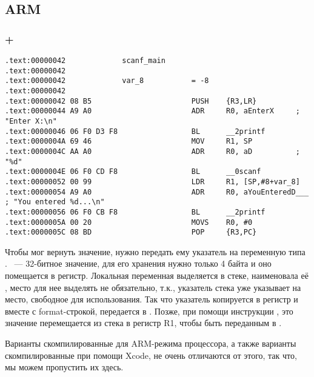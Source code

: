 ﻿\subsection{ARM}

\subsubsection{\OptimizingKeil + \ThumbMode}

\begin{lstlisting}
.text:00000042             scanf_main
.text:00000042
.text:00000042             var_8           = -8
.text:00000042
.text:00000042 08 B5                       PUSH    {R3,LR}
.text:00000044 A9 A0                       ADR     R0, aEnterX     ; "Enter X:\n"
.text:00000046 06 F0 D3 F8                 BL      __2printf
.text:0000004A 69 46                       MOV     R1, SP
.text:0000004C AA A0                       ADR     R0, aD          ; "%d"
.text:0000004E 06 F0 CD F8                 BL      __0scanf
.text:00000052 00 99                       LDR     R1, [SP,#8+var_8]
.text:00000054 A9 A0                       ADR     R0, aYouEnteredD___ ; "You entered %d...\n"
.text:00000056 06 F0 CB F8                 BL      __2printf
.text:0000005A 00 20                       MOVS    R0, #0
.text:0000005C 08 BD                       POP     {R3,PC}
\end{lstlisting}

Чтобы \scanf мог вернуть значение, нужно передать ему указатель на переменную типа \Tint. \Tint ~--- 32-битное 
значение, для его хранения нужно только 4 байта и оно помещается в регистр.
Локальная переменная  выделяется в стеке, \IDA наименовала её , место для нее выделять
не обязательно, т.к., указатель стека \SP уже указывает на место, свободное для использования.
Так что указатель \SP копируется в регистр \Rone и вместе с format-строкой, передается в \scanf.
Позже, при помощи инструкции , это значение перемещается из стека в регистр R1, чтобы быть переданным
в \printf.

Варианты скомпилированные для ARM-режима процессора, а также варианты скомпилированные при помощи Xcode,
не очень отличаются от этого, так что, мы можем пропустить их здесь.


